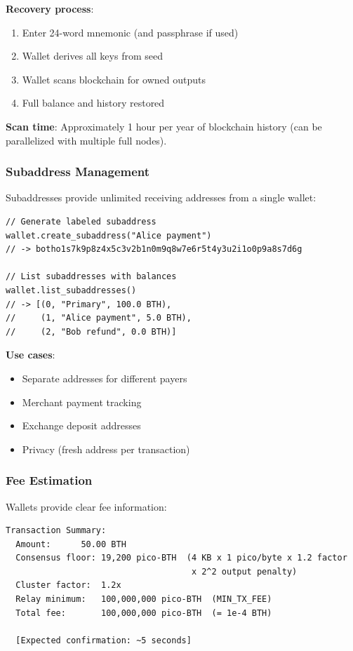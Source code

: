 \textbf{Recovery process}:
\begin{enumerate}
  \item Enter 24-word mnemonic (and passphrase if used)
  \item Wallet derives all keys from seed
  \item Wallet scans blockchain for owned outputs
  \item Full balance and history restored
\end{enumerate}

\textbf{Scan time}: Approximately 1 hour per year of blockchain history
(can be parallelized with multiple full nodes).

\subsubsection{Subaddress Management}

Subaddresses provide unlimited receiving addresses from a single wallet:

\begin{lstlisting}[caption={Subaddress interface}]
// Generate labeled subaddress
wallet.create_subaddress("Alice payment")
// -> botho1s7k9p8z4x5c3v2b1n0m9q8w7e6r5t4y3u2i1o0p9a8s7d6g

// List subaddresses with balances
wallet.list_subaddresses()
// -> [(0, "Primary", 100.0 BTH),
//     (1, "Alice payment", 5.0 BTH),
//     (2, "Bob refund", 0.0 BTH)]
\end{lstlisting}

\textbf{Use cases}:
\begin{itemize}
  \item Separate addresses for different payers
  \item Merchant payment tracking
  \item Exchange deposit addresses
  \item Privacy (fresh address per transaction)
\end{itemize}

\subsubsection{Fee Estimation}

Wallets provide clear fee information:

\begin{lstlisting}[caption={Fee estimation display}]
Transaction Summary:
  Amount:      50.00 BTH
  Consensus floor: 19,200 pico-BTH  (4 KB x 1 pico/byte x 1.2 factor
                                     x 2^2 output penalty)
  Cluster factor:  1.2x
  Relay minimum:   100,000,000 pico-BTH  (MIN_TX_FEE)
  Total fee:       100,000,000 pico-BTH  (= 1e-4 BTH)

  [Expected confirmation: ~5 seconds]
\end{lstlisting}

